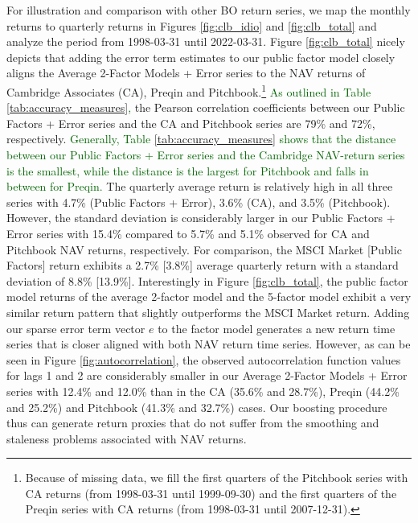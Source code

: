 \documentclass[12pt]{article}
\begin{document}
For illustration and comparison with other BO return series, we map the monthly returns to quarterly returns in Figures \ref{fig:clb_idio} and \ref{fig:clb_total} and analyze the period from 1998-03-31 until 2022-03-31.
Figure \ref{fig:clb_total} nicely depicts that adding the error term estimates to our public factor model closely aligns the Average 2-Factor Models + Error series to the NAV returns of Cambridge Associates (CA), Preqin and Pitchbook.\footnote{Because of missing data, we fill the first quarters of the Pitchbook series with CA returns (from 1998-03-31 until 1999-09-30) and the first quarters of the Preqin series with CA returns (from 1998-03-31 until 2007-12-31).
}
\textcolor{darkgreen}{As outlined in Table \ref{tab:accuracy_measures},} the Pearson correlation coefficients between our Public Factors + Error series and the CA and Pitchbook series are 79\% and 72\%, respectively.
\textcolor{darkgreen}{
Generally, Table \ref{tab:accuracy_measures} shows that the distance between our Public Factors + Error series and the Cambridge NAV-return series is the smallest, while the distance is the largest for Pitchbook and falls in between for Preqin.
}
The quarterly average return is relatively high in all three series with 4.7\% (Public Factors + Error), 3.6\% (CA), and 3.5\% (Pitchbook).
However, the standard deviation is considerably larger in our Public Factors + Error series with 15.4\% compared to 5.7\% and 5.1\% observed for CA and Pitchbook NAV returns, respectively.
For comparison, the MSCI Market [Public Factors] return exhibits a 2.7\% [3.8\%] average quarterly return with a standard deviation of 8.8\% [13.9\%].
Interestingly in Figure \ref{fig:clb_total}, the public factor model returns of the average 2-factor model and the 5-factor model exhibit a very similar return pattern that slightly outperforms the MSCI Market return.
Adding our sparse error term vector $e$ to the factor model generates a new return time series that is closer aligned with both NAV return time series.
However, as can be seen in Figure \ref{fig:autocorrelation}, the observed autocorrelation function values for lags 1 and 2 are considerably smaller in our Average 2-Factor Models + Error series with 12.4\% and 12.0\% than in the CA (35.6\% and 28.7\%), Preqin (44.2\% and 25.2\%) and Pitchbook (41.3\% and 32.7\%) cases.
Our boosting procedure thus can generate return proxies that do not suffer from the smoothing and staleness problems associated with NAV returns.
\end{document}
